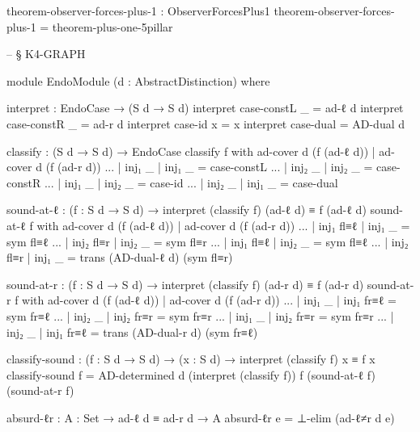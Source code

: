 \documentclass[11pt,a4paper]{book}
\begin{document}
\begin{code}
theorem-observer-forces-plus-1 : ObserverForcesPlus1
theorem-observer-forces-plus-1 = theorem-plus-one-5pillar


-- § K4-GRAPH

module EndoModule (d : AbstractDistinction) where

  interpret : EndoCase → (S d → S d)
  interpret case-constL _ = ad-ℓ d
  interpret case-constR _ = ad-r d
  interpret case-id     x = x
  interpret case-dual     = AD-dual d

  classify : (S d → S d) → EndoCase
  classify f with ad-cover d (f (ad-ℓ d)) | ad-cover d (f (ad-r d))
  ... | inj₁ _ | inj₁ _ = case-constL
  ... | inj₂ _ | inj₂ _ = case-constR
  ... | inj₁ _ | inj₂ _ = case-id
  ... | inj₂ _ | inj₁ _ = case-dual

  sound-at-ℓ : (f : S d → S d) →
               interpret (classify f) (ad-ℓ d) ≡ f (ad-ℓ d)
  sound-at-ℓ f with ad-cover d (f (ad-ℓ d)) | ad-cover d (f (ad-r d))
  ... | inj₁ fl≡ℓ | inj₁ _     = sym fl≡ℓ
  ... | inj₂ fl≡r | inj₂ _     = sym fl≡r
  ... | inj₁ fl≡ℓ | inj₂ _     = sym fl≡ℓ
  ... | inj₂ fl≡r | inj₁ _     = trans (AD-dual-ℓ d) (sym fl≡r)

  sound-at-r : (f : S d → S d) →
               interpret (classify f) (ad-r d) ≡ f (ad-r d)
  sound-at-r f with ad-cover d (f (ad-ℓ d)) | ad-cover d (f (ad-r d))
  ... | inj₁ _     | inj₁ fr≡ℓ = sym fr≡ℓ
  ... | inj₂ _     | inj₂ fr≡r = sym fr≡r
  ... | inj₁ _     | inj₂ fr≡r = sym fr≡r
  ... | inj₂ _     | inj₁ fr≡ℓ = trans (AD-dual-r d) (sym fr≡ℓ)

  classify-sound : (f : S d → S d) →
                   (x : S d) → interpret (classify f) x ≡ f x
  classify-sound f = AD-determined d
    (interpret (classify f)) f
    (sound-at-ℓ f) (sound-at-r f)

  absurd-ℓr : {A : Set} → ad-ℓ d ≡ ad-r d → A
  absurd-ℓr e = ⊥-elim (ad-ℓ≠r d e)


\end{code}
\end{document}
